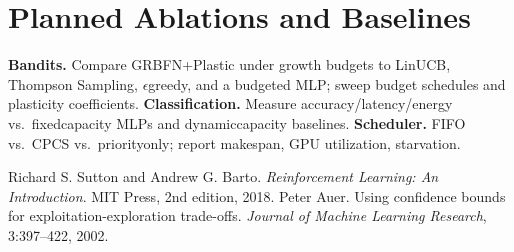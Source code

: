 \documentclass[
]{article}
\begin{document}
\section*{Planned Ablations and Baselines}
\textbf{Bandits.} Compare GRBFN+Plastic under growth budgets to LinUCB, Thompson Sampling, $\epsilon$\-greedy, and a budgeted MLP; sweep budget schedules and plasticity coefficients. \textbf{Classification.} Measure accuracy/latency/energy vs.\ fixed\-capacity MLPs and dynamic\-capacity baselines. \textbf{Scheduler.} FIFO vs.\ CPCS vs.\ priority\-only; report makespan, GPU utilization, starvation.


\begin{thebibliography}{9}
 Richard S. Sutton and Andrew G. Barto. \emph{Reinforcement Learning: An Introduction}. MIT Press, 2nd edition, 2018.
 Peter Auer. Using confidence bounds for exploitation-exploration trade-offs. \emph{Journal of Machine Learning Research}, 3:397--422, 2002.
\end{thebibliography}
\end{document}
